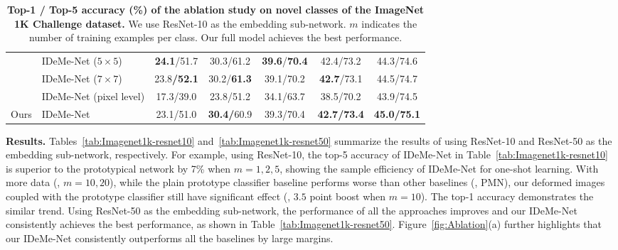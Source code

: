 \documentclass[10pt,letterpaper,twocolumn]{article}
\providecommand{\tabularnewline}{\\}
\begin{document}
\begin{table*}
\begin{centering}
\begin{tabular}{llccccc}
 & {\small{}{}{}{}{}{}IDeMe-Net ($5\times5$)  } & \textbf{\small{}{}{}{}{}{}{}24.1}{\small{}{}{}{}{}{}/{}51.7
 } & \textbf{\small{}{}{}{}{}{}}{\small{}{}{}{}{}{}30.3{}{}/{}61.2
 } & \textbf{\small{}{}{}{}{}{}{}39.6}{\small{}{}{}{}{}{}/}\textbf{\small{}{}{}{}{}{}{}70.4}{\small{}{}{}{}{}
 } & {\small{}{}{}{}{}{}42.4/{}73.2{}  } & {\small{}{}{}{}{}{}44.3/74.6}\tabularnewline
 & {\small{}{}{}{}{}{}IDeMe-Net ($7\times7$)  } & {\small{}{}{}{}{}{}{}23.8}\textbf{\small{}{}{}{}{}{}/{}52.1}{\small{}{}{}{}{}
 } & {\small{}{}{}{}{}{}30.2/}\textbf{\small{}{}{}{}{}{}{}61.3}{\small{}{}{}{}{}
 } & {\small{}{}{}{}{}{}39.1/70.2  } & {\small{}{}{}{}{}{}}\textbf{\small{}{}{}{}{}{}42.7}{\small{}{}{}{}{}/73.1
 } & \textbf{\small{}{}{}{}{}}{\small{}{}44.5{}/{}74.7}\tabularnewline
 & {\small{}{}{}{}{}{}IDeMe-Net (pixel level)  } & {\small{}{}{}{}{}{}17.3/39.0  } & {\small{}{}{}{}{}{}23.8/51.2  } & {\small{}{}{}{}{}{}34.1/63.7  } & {\small{}{}{}{}{}{}38.5/70.2  } & {\small{}{}{}{}{}{}43.9/74.5 }\tabularnewline
\hline 
{\small{}{}Ours  } & {\small{}{}{}{}{}{}IDeMe-Net  } & {\small{}{}{}{}{}23.1/51.0  } & \textbf{\small{}{}30.4{}/}{\small{}{}60.9  } & {\small{}{}{}{}{}{}39.3{}/{}70.4{}  } & \textbf{\small{}{}42.7/73.4}{\small{}{}  } & \textbf{\small{}{}{}{}{}{}45.0/75.1}\tabularnewline
\hline 
\end{tabular}
\par\end{centering}
\vspace{0.1in}
\caption{\textbf{\label{tab:resnet-10-imagenet1kablation}Top-1 / Top-5 accuracy (\%)
of the ablation study on novel classes of the ImageNet 1K Challenge dataset.}
We use ResNet-10 as the embedding sub-network. $m$ indicates the number of training
examples per class. Our full model achieves the best performance.}



\end{table*}

\noindent \textbf{Results.} Tables~\ref{tab:Imagenet1k-resnet10}
and~\ref{tab:Imagenet1k-resnet50} summarize the results of using
ResNet-10 and ResNet-50 as the embedding sub-network, respectively.
For example, using ResNet-10, the top-5 accuracy of IDeMe-Net
in Table~\ref{tab:Imagenet1k-resnet10} is superior to the prototypical
network by 7\% when $m=1,2,5$, showing the sample efficiency of IDeMe-Net
for one-shot learning. With more data (\eg, $m=10,20$), 
while the plain prototype classifier baseline performs worse than other baselines (\eg, PMN), 
our deformed images coupled with the prototype classifier still have significant effect (\eg, $3.5$ point boost when $m=10$).
The top-1 accuracy 
demonstrates the similar trend.
Using ResNet-50 as the embedding sub-network, the performance of all
the approaches improves and our IDeMe-Net consistently achieves the
best performance, as shown in Table~\ref{tab:Imagenet1k-resnet50}. Figure~\ref{fig:Ablation}(a) further highlights that our IDeMe-Net
consistently outperforms all the baselines by large
margins.
\end{document}
